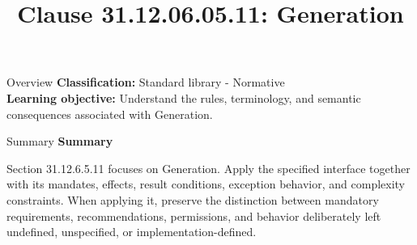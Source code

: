 \documentclass[10pt,letterpaper]{article}
\title{Clause 31.12.06.05.11: Generation}
\author{}
\date{}
\begin{document}
\maketitle
\begin{CornellOverviewBox}{Overview}
\textbf{Classification:} Standard library - Normative\\[2pt]
\textbf{Learning objective:} Understand the rules, terminology, and semantic consequences associated with Generation.
\end{CornellOverviewBox}\begin{CornellSummaryBox}{Summary}
{\sffamily\bfseries\color{Accent} Summary}\par\vspace{3pt}Section 31.12.6.5.11 focuses on Generation. Apply the specified interface together with its mandates, effects, result conditions, exception behavior, and complexity constraints. When applying it, preserve the distinction between mandatory requirements, recommendations, permissions, and behavior deliberately left undefined, unspecified, or implementation-defined.
\end{CornellSummaryBox}
\end{document}
